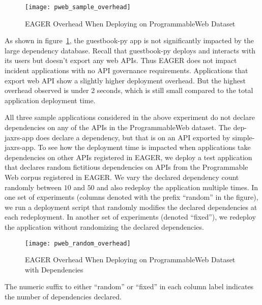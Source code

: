 \begin{figure}
\centering
\texttt{[image: pweb\_sample\_overhead]}
\caption{EAGER Overhead When Deploying on ProgrammableWeb Dataset}
\label{fig:pweb_sample_overhead}
\end{figure}

As shown in figure~\ref{fig:pweb_sample_overhead}, the guestbook-py app is not
significantly impacted by the large dependency database. 
Recall that 
guestbook-py deploys and interacts with its users but doesn't export any 
web APIs.  Thus EAGER does not impact incident applications with no API
governance requirements. 
Applications that export web API show a slightly higher deployment overhead. 
But the highest overhead observed is under 2 seconds, which is still small 
compared
to the total application deployment time. 

All three sample applications considered in the above experiment do not declare dependencies on any of the APIs in the ProgrammableWeb
dataset. The dep-jaxrs-app does declare a dependency, but that is on an API exported by simple-jaxrs-app. To see how the deployment time is impacted
when applications take dependencies on other APIs registered in EAGER, we
deploy a test application that declares random fictitious dependencies on APIs
from the Programmable Web corpus registered in EAGER. 
We vary the declared dependency count randomly between $10$ and $50$ 
and also redeploy the application multiple times.
In one set of experiments (columns denoted with the prefix ``random'' in the
figure), we run a deployment script that randomly modifies the 
declared dependencies at each redeployment. In another set of 
experiments (denoted ``fixed''), we redeploy the application 
without randomizing the declared dependencies.

\begin{figure}
\centering
\texttt{[image: pweb\_random\_overhead]}
\caption{EAGER Overhead When Deploying on ProgrammableWeb Dataset with Dependencies}
\label{fig:pweb_random_overhead}
\end{figure}

The numeric suffix to either ``random'' or ``fixed'' in each column
label indicates the number of dependencies declared.

